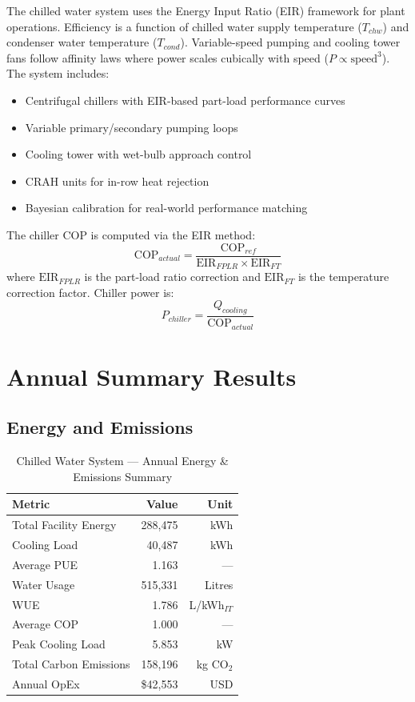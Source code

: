 \documentclass[12pt,a4paper]{report}
\begin{document}
The chilled water system uses the Energy Input Ratio (EIR) framework for plant operations.
Efficiency is a function of chilled water supply temperature ($T_{chw}$) and condenser water
temperature ($T_{cond}$). Variable-speed pumping and cooling tower fans follow affinity laws
where power scales cubically with speed ($P \propto \text{speed}^3$). The system includes:

\begin{itemize}[noitemsep]
  \item Centrifugal chillers with EIR-based part-load performance curves
  \item Variable primary/secondary pumping loops
  \item Cooling tower with wet-bulb approach control
  \item CRAH units for in-row heat rejection
  \item Bayesian calibration for real-world performance matching
\end{itemize}

The chiller COP is computed via the EIR method:
\begin{equation}
\text{COP}_{actual} = \frac{\text{COP}_{ref}}{\text{EIR}_{FPLR} \times \text{EIR}_{FT}}
\label{eq:chw_cop}
\end{equation}
where $\text{EIR}_{FPLR}$ is the part-load ratio correction and $\text{EIR}_{FT}$ is the
temperature correction factor. Chiller power is:
\begin{equation}
P_{chiller} = \frac{Q_{cooling}}{\text{COP}_{actual}}
\label{eq:chw_power}
\end{equation}

\section{Annual Summary Results}

\subsection{Energy and Emissions}

\begin{table}[H]
\centering
\caption{Chilled Water System --- Annual Energy \& Emissions Summary}
\label{tab:chw_annual}
\renewcommand{\arraystretch}{1.3}
\begin{tabular}{lrr}
\toprule
\textbf{Metric} & \textbf{Value} & \textbf{Unit} \\
\midrule
Total Facility Energy & 288{,}475 & kWh \\
Cooling Load & 40{,}487 & kWh \\
Average PUE & 1.163 & --- \\
Water Usage & 515{,}331 & Litres \\
WUE & 1.786 & L/kWh$_{IT}$ \\
Average COP & 1.000 & --- \\
Peak Cooling Load & 5.853 & kW \\
Total Carbon Emissions & 158{,}196 & kg CO$_2$ \\
Annual OpEx & \$42{,}553 & USD \\
\bottomrule
\end{tabular}
\end{table}
\end{document}
